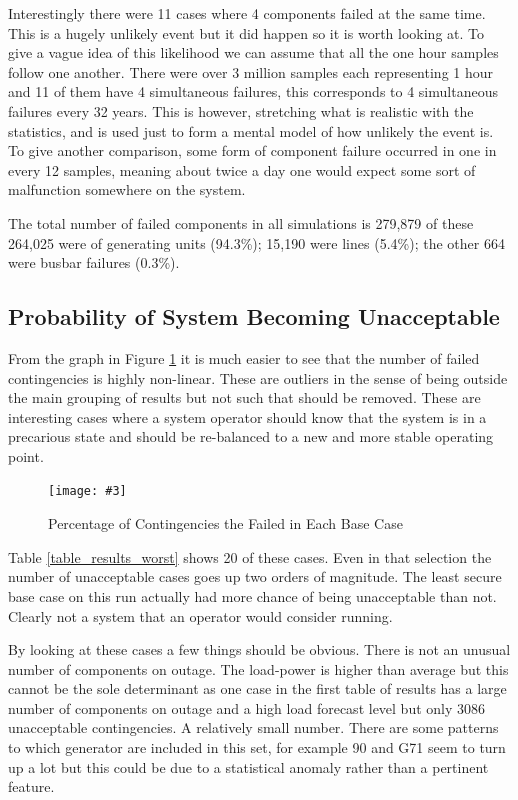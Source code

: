 \documentclass[a4paper,oneside,12pt]{report}
\newcommand{\image}[3] {
  \begin{figure}
    \begin{center}
      \texttt{[image: \#3]}
      \caption{#2}
      \label{#1}
    \end{center}
  \end{figure}
}
\begin{document}
Interestingly there were 11 cases where 4 components failed at the same time. This is a hugely unlikely event but it did happen so it is worth looking at. To give a vague idea of this likelihood we can assume that all the one hour samples follow one another. There were over 3 million samples each representing 1 hour and 11 of them have 4 simultaneous failures, this corresponds to 4 simultaneous failures every 32 years. This is however, stretching what is realistic with the statistics, and is used just to form a mental model of how unlikely the event is. To give another comparison, some form of component failure occurred in one in every 12 samples, meaning about twice a day one would expect some sort of malfunction somewhere on the system.

The total number of failed components in all simulations is 279,879 of these 264,025 were of generating units (94.3\%); 15,190 were lines (5.4\%); the other 664 were busbar failures (0.3\%). 

\subsection{Probability of System Becoming Unacceptable}

From the graph in Figure \ref{probacceptable} it is much easier to see that the number of failed contingencies is highly non-linear. These are outliers in the sense of being outside the main grouping of results but not such that should be removed. These are interesting cases where a system operator should know that the system is in a precarious state and should be re-balanced to a new and more stable operating point.

\image{probacceptable}{Percentage of Contingencies the Failed in Each Base Case}{probacceptable.png}

Table \ref{table_results_worst} shows 20 of these cases. Even in that selection the number of unacceptable cases goes up two orders of magnitude. The least secure base case on this run actually had more chance of being unacceptable than not. Clearly not a system that an operator would consider running.

By looking at these cases a few things should be obvious. There is not an unusual number of components on outage. The load-power is higher than average but this cannot be the sole determinant as one case in the first table of results has a large number of components on outage and a high load forecast level but only 3086 unacceptable contingencies. A relatively small number. There are some patterns to which generator are included in this set, for example 90 and G71 seem to turn up a lot but this could be due to a statistical anomaly rather than a pertinent feature.
\end{document}
